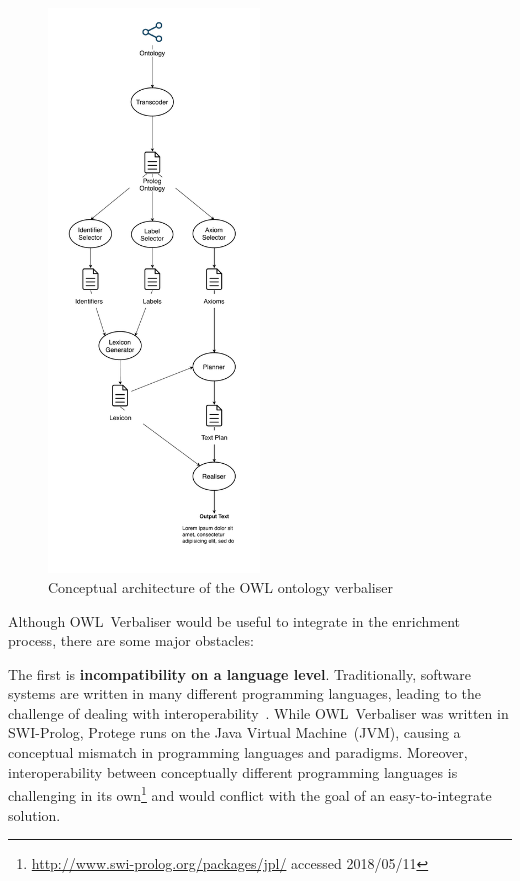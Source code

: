 \documentclass[draft,final]{vutinfth} %
\begin{document}
\begin{figure}
	 \centering
	 \includegraphics[width=0.5\textwidth]{drawio/Ontology_Verbaliser_Architecture}
	 \caption{Conceptual architecture of the OWL ontology verbaliser~\cite{stevens2011}}\label{fig:verbaliser_architecture}
\end{figure}

Although OWL~Verbaliser would be useful to integrate in the enrichment process, there are some major obstacles:

The first is \textbf{incompatibility on a language level}. Traditionally, software systems are written in many different programming languages, leading to the challenge of dealing with interoperability~\cite{malone2014}. While OWL~Verbaliser was written in SWI-Prolog, Protege runs on the Java Virtual Machine~(JVM), causing a conceptual mismatch in programming languages and paradigms. Moreover, interoperability between conceptually different programming languages is challenging in its own\footnote{\url{http://www.swi-prolog.org/packages/jpl/} accessed 2018/05/11} and would conflict with the goal of an easy-to-integrate solution.
\end{document}
